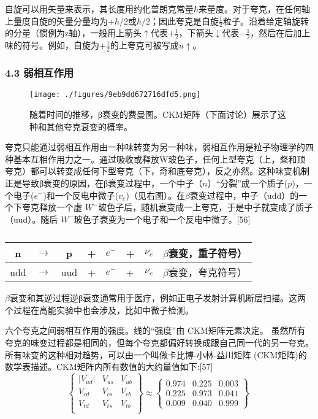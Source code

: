 自旋可以用矢量来表示，其长度用约化普朗克常量$\hbar$来量度。对于夸克，在任何轴上量度自旋的矢量分量均为$+\hbar/2$或$\hbar/2$；因此夸克是自旋$\frac{1}{2}$粒子。沿着给定轴旋转的分量（惯例为z轴），一般用上箭头$\uparrow$代表$+\frac{1}{2}$，下箭头$\downarrow$代表$-\frac{1}{2}$，然后在后加上味的符号。例如，自旋为$+\frac{1}{2}$的上夸克可被写成$u\uparrow$。


\subsubsection{4.3 弱相互作用}
\begin{figure}[ht]
\centering
\texttt{[image: ./figures/9eb9dd672716dfd5.png]}
\caption{随着时间的推移，β衰变的费曼图。CKM矩阵（下面讨论）展示了这种和其他夸克衰变的概率。} \label{fig_Quark_5}
\end{figure}
夸克只能通过弱相互作用由一种味转变为另一种味，弱相互作用是粒子物理学的四种基本互相作用力之一。通过吸收或释放W玻色子，任何上型夸克（上，粲和顶夸克）都可以转变成任何下型夸克（下，奇和底夸克），反之亦然。这种味变机制正是导致β衰变的原因，在β衰变过程中，一个中子（$n$）“分裂”成一个质子($p$)，一个电子($e^{-}$)和一个反电中微子($v_e$)（见右图）。在$\beta$衰变过程中，中子（udd）的一个下夸克释放一个虚 $W^{-}$玻色子后，随机衰变成一上夸克，于是中子就变成了质子（uud）。随后 $W^{-}$玻色子衰变为一个电子和一个反电中微子。[56]
\begin{table}[ht]
\centering
\caption\label{Quark}
\begin{tabular}{|c|c|c|c}
\hline
n & $\rightarrow$ & p & + & $e^{-}$ & + &  $\nu_{e}$ & $\beta$衰变，重子符号） \\
\hline
udd & $\rightarrow$ & uud & + & $e^{-}$ & + & $\nu_{e}$ &$\beta$衰变，夸克符号） \\
\hline
\end{tabular}
\end{table}
$\beta$衰变和其逆过程逆β衰变通常用于医疗，例如正电子发射计算机断层扫描。这两个过程在高能实验中也会涉及，比如中微子检测。

六个夸克之间弱相互作用的强度。线的“强度”由 CKM矩阵元素决定。
虽然所有夸克的味变过程都是相同的，但每个夸克都偏好转换成跟自己同一代的另一夸克。所有味变的这种相对趋势，可以由一个叫做卡比博-小林-益川矩阵 (CKM矩阵)的数学表描述。CKM矩阵内所有数值的大约量值如下:[57]
\begin{equation}
\begin{Bmatrix}
|V_{ud}| & V_{us} & V_{ub} \\
V_{cd} & V_{cs} & V_{cb} \\
V_{td} & V_{ts} & V_{tb} \\
\end{Bmatrix}
\approx
\begin{Bmatrix}
0.974 & 0.225 & 0.003 \\
0.225 & 0.973 & 0.041 \\
0.009 & 0.040 & 0.999
\end{Bmatrix}~
\end{equation}